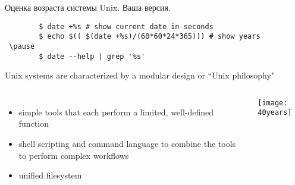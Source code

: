 \begin{frame}[fragile]{Оценка возраста системы Unix.}
Ваша версия.
 \pause
    \begin{lstlisting}
        $ date +%s # show current date in seconds
        $ echo $(( $(date +%s)/(60*60*24*365))) # show years
 \pause
        $ date --help | grep '%s'
    \end{lstlisting}
\pause
Unix systems are characterized by a \alert{modular design} or ``Unix philosophy"
		\begin{columns}
\begin{itemize}
    \item simple tools that each perform a limited, well-defined function
    \item shell scripting and command language to combine the tools to perform complex workflows
    \item unified filesystem
\end{itemize}
            \texttt{[image: 40years]}
		\end{columns}
\end{frame}

